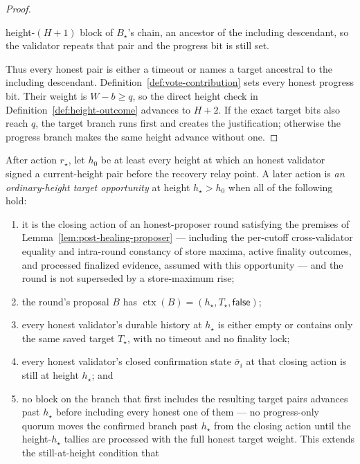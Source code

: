 \begin{proof}
\begin{enumerate}
   height-\((H{+}1)\) block of \(B_\star\)'s chain, an ancestor of
   the including descendant, so the validator repeats that pair and the
   progress bit is still set.
\end{enumerate}
Thus every honest pair is either a timeout or names a target ancestral to
the including descendant.  Definition~\ref{def:vote-contribution} sets every
honest progress bit.  Their weight is \(W-b\geq q\), so the direct height
check in Definition~\ref{def:height-outcome} advances to \(H+2\).  If the
exact target bits also reach \(q\), the target branch runs first and creates
the justification; otherwise the progress branch makes the same height
advance without one.
\end{proof}

\begin{definition}
\label{def:fresh-ordinary-action}
After action \(r_\star\), let \(h_0\) be at least every height at which an
honest validator signed a current-height pair before the recovery relay
point.  A later action is
\emph{an ordinary-height target opportunity} at height
\(h_\star>h_0\) when all of the following hold:
\begin{enumerate}
 \item it is the closing action of an honest-proposer round satisfying
   the premises of Lemma~\ref{lem:post-healing-proposer} --- including
   the per-cutoff cross-validator equality and intra-round constancy of
   store maxima, active finality outcomes, and processed finalized
   evidence, assumed with this opportunity --- and the round is not
   superseded by a store-maximum rise;
 \item the round's proposal \(B\) has
   \(\operatorname{ctx}(B)=(h_\star,T_\star,\mathsf{false})\);
 \item every honest validator's durable history at \(h_\star\) is
   either empty or contains only the same saved target \(T_\star\),
   with no timeout and no finality lock;
 \item every honest validator's closed confirmation state
   \(\bar\sigma_i\) at that closing action is still at height
   \(h_\star\); and
 \item no block on the branch that first includes the resulting target
   pairs advances past \(h_\star\) before including every honest one
   of them --- no progress-only quorum moves the confirmed branch past
   \(h_\star\) from the closing action until the height-\(h_\star\)
   tallies are processed with the full honest target weight.  This
   extends the still-at-height condition that

\end{enumerate}
\end{definition}
